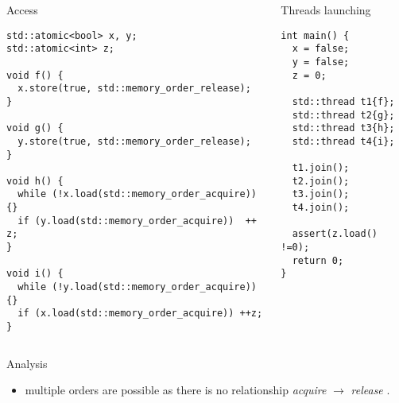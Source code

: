 \begin{frame}[t,fragile]
\begin{columns}

\begin{column}{.6\textwidth}
\begin{block}{Access}
\begin{lstlisting}
std::atomic<bool> x, y;
std::atomic<int> z;

void f() {
  x.store(true, std::memory_order_release);
}

void g() {
  y.store(true, std::memory_order_release);
}

void h() {
  while (!x.load(std::memory_order_acquire)) {}
  if (y.load(std::memory_order_acquire))  ++ z;
}

void i() {
  while (!y.load(std::memory_order_acquire)) {}
  if (x.load(std::memory_order_acquire)) ++z;
}
\end{lstlisting}
\end{block}
\end{column}

\begin{column}{.4\textwidth}
\begin{block}{Threads launching}
\begin{lstlisting}
int main() {
  x = false;
  y = false;
  z = 0;

  std::thread t1{f};
  std::thread t2{g};
  std::thread t3{h};
  std::thread t4{i};

  t1.join();
  t2.join();
  t3.join();
  t4.join();

  assert(z.load() !=0);
  return 0;
}
\end{lstlisting}
\end{block}
\end{column}

\end{columns}
\end{frame}

\begin{frame}[t]{Analysis}


\begin{itemize}
  \item multiple orders are possible as there is no relationship
         \emph{acquire} $\rightarrow$ \emph{release} .
\end{itemize}
\end{frame}

